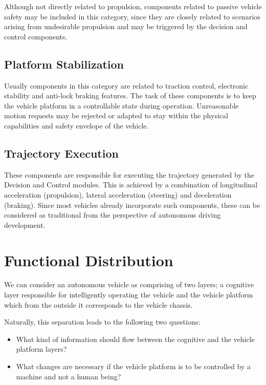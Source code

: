 Although not directly related to propulsion, components related to passive vehicle safety may be included in this category, since they are closely related to scenarios arising from undesirable propulsion and may be triggered by the decision and control components.

\subsection{Platform Stabilization}

Usually components in this category are related to traction control, electronic stability and anti-lock braking features. The task of these components is to keep the vehicle platform in a controllable state during operation. Unreasonable motion requests may be rejected or adapted to stay within the physical capabilities and safety envelope of the vehicle.

\subsection{Trajectory Execution}

These components are responsible for executing the trajectory generated by the Decision and Control modules. This is achieved by a combination of longitudinal acceleration (propulsion), lateral acceleration  (steering) and deceleration (braking). Since most vehicles already incorporate such components, these can be considered as traditional from the perspective of autonomous driving development.


\section{Functional Distribution}

We can consider an autonomous vehicle as comprising of two layers; a cognitive 
layer responsible for intelligently operating the vehicle and the vehicle platform which from the outside it corresponds to the vehicle chassis. 

Naturally, this separation leads to the following two questions:

\begin{itemize}
\item What kind of information should flow between the cognitive and the vehicle platform layers?
\item What changes are necessary if the vehicle platform is to be controlled by a machine and not a human being?
\end{itemize}

